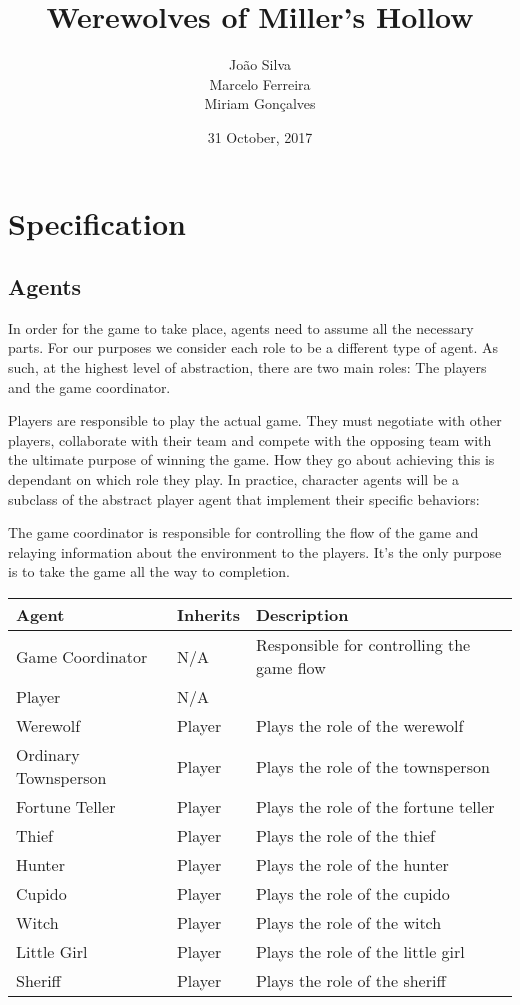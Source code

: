 \documentclass{article}
\title{\textbf{Werewolves of Miller's Hollow}}
\author{João Silva\\
		Marcelo Ferreira\\
		Miriam Gonçalves}
\date{31 October, 2017}
\begin{document}
\maketitle

\section{Specification}

\subsection{Agents}
In order for the game to take place, agents need to assume all the necessary parts. For our purposes we consider each role to be a different type of agent. As such, at the highest level of abstraction, there are two main roles: The players and the game coordinator.

Players are responsible to play the actual game. They must negotiate with other players, collaborate with their team and compete with the opposing team with the ultimate purpose of winning the game. How they go about achieving this is dependant on which role they play. In practice, character agents will be a subclass of the abstract player agent that implement their specific behaviors:

The game coordinator is responsible for controlling the flow of the game and relaying information about the environment to the players. It's the only purpose is to take the game all the way to completion.

\begin{center}
	\begin{tabular}{ p{3cm} l p{5cm} }
	Agent & Inherits & Description \\
	\hline
	Game Coordinator & N/A & Responsible for controlling the game flow\\
	Player & N/A \\
	Werewolf & Player & Plays the role of the werewolf \\
	Ordinary Townsperson & Player & Plays the role of the townsperson \\
	Fortune Teller & Player & Plays the role of the fortune teller \\
	Thief & Player & Plays the role of the thief \\
	Hunter & Player & Plays the role of the hunter \\
	Cupido & Player & Plays the role of the cupido \\
	Witch & Player & Plays the role of the witch \\
	Little Girl & Player & Plays the role of the little girl \\
	Sheriff & Player & Plays the role of the sheriff \\
	\end{tabular}
\end{center}
\end{document}
